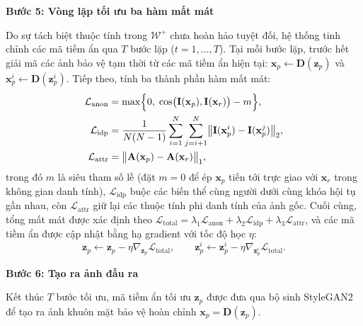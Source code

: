 \par\medskip\noindent\textbf{Bước 5: Vòng lặp tối ưu ba hàm mất mát}\par\smallskip
Do sự tách biệt thuộc tính trong $\mathcal{W}^+$ chưa hoàn hảo tuyệt đối, hệ thống tinh chỉnh các mã tiềm ẩn qua $T$ bước lặp ($t = 1, \dots, T$). Tại mỗi bước lặp, trước hết giải mã các ảnh bảo vệ tạm thời từ các mã tiềm ẩn hiện tại: $\mathbf{x}_p \leftarrow \mathbf{D}(\mathbf{z}_p)$ và $\mathbf{x}_p^i \leftarrow \mathbf{D}(\mathbf{z}_p^i)$. Tiếp theo, tính ba thành phần hàm mất mát:
\begin{align}
\mathcal{L}_{\text{anon}} &= \max\Bigl\{0,\; \cos\bigl(\mathbf{I}(\mathbf{x}_p), \mathbf{I}(\mathbf{x}_r)\bigr) - m\Bigr\}, \\
\mathcal{L}_{\text{idp}} &= \frac{1}{N(N-1)} \sum_{i=1}^{N} \sum_{j=i+1}^{N} \bigl\| \mathbf{I}(\mathbf{x}_p^i) - \mathbf{I}(\mathbf{x}_p^j) \bigr\|_2, \\
\mathcal{L}_{\text{attr}} &= \bigl\| \mathbf{A}(\mathbf{x}_p) - \mathbf{A}(\mathbf{x}_r) \bigr\|_1,
\end{align}
trong đó $m$ là siêu tham số lề (đặt $m = 0$ để ép $\mathbf{x}_p$ tiến tới trực giao với $\mathbf{x}_r$ trong không gian danh tính), $\mathcal{L}_{\text{idp}}$ buộc các biến thể cùng người dưới cùng khóa hội tụ gần nhau, còn $\mathcal{L}_{\text{attr}}$ giữ lại các thuộc tính phi danh tính của ảnh gốc. Cuối cùng, tổng mất mát được xác định theo $\mathcal{L}_{\text{total}} = \lambda_1 \mathcal{L}_{\text{anon}} + \lambda_2 \mathcal{L}_{\text{idp}} + \lambda_3 \mathcal{L}_{\text{attr}}$, và các mã tiềm ẩn được cập nhật bằng hạ gradient với tốc độ học $\eta$:
\[
\mathbf{z}_p \leftarrow \mathbf{z}_p - \eta \nabla_{\mathbf{z}_p} \mathcal{L}_{\text{total}}, \qquad \mathbf{z}_p^i \leftarrow \mathbf{z}_p^i - \eta \nabla_{\mathbf{z}_p^i} \mathcal{L}_{\text{total}}.
\]

\par\medskip\noindent\textbf{Bước 6: Tạo ra ảnh đầu ra}\par\smallskip
Kết thúc $T$ bước tối ưu, mã tiềm ẩn tối ưu $\mathbf{z}_p$ được đưa qua bộ sinh StyleGAN2 để tạo ra ảnh khuôn mặt bảo vệ hoàn chỉnh $\mathbf{x}_p = \mathbf{D}(\mathbf{z}_p)$.
\par
\endgroup
